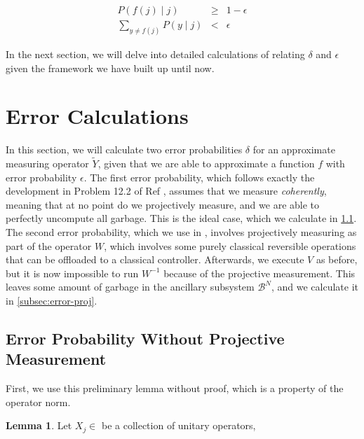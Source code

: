 \documentclass{article}
\theoremstyle{definition} \newtheorem{lemma}{Lemma}
\theoremstyle{definition} \newtheorem{theorem}{Theorem}
\begin{document}
\begin{eqnarray}
P(f(j) \mid j) & \ge & 1 - \epsilon \\
\sum_{y \ne f(j)} P(y \mid j) & < & \epsilon
\label{eqn:f-approx}
\end{eqnarray}

In the next section, we will delve into detailed calculations of relating
$\delta$ and $\epsilon$ given the framework we have built up until now.

\section{Error Calculations}

In this section, we will calculate two error probabilities $\delta$ for
an approximate measuring operator $\tilde{Y}$, given that we are able to
approximate a function $f$ with error probability $\epsilon$. The first
error probability, which follows exactly the development in Problem 12.2
of Ref \cite{Kitaev2002}, assumes that we measure \emph{coherently}, meaning
that at no point do we projectively measure, and we are able to perfectly
uncompute all garbage. This is the ideal case, which we calculate in
\ref{subsec:error-noproj}. The second error probability, which we use in
\cite{Pham2012a}, involves projectively measuring as part of the operator $W$,
which involves some purely classical reversible operations that can be
offloaded to a classical controller. Afterwards, we execute $V$ as before,
but it is now impossible to run $W^{-1}$ because of the projective measurement.
This leaves some amount of garbage in the ancillary
subsystem $\mathcal{B}^N$, and we calculate it in \ref{subsec:error-proj}.

\subsection{Error Probability Without Projective Measurement}
\label{subsec:error-noproj}

First, we use this preliminary lemma without proof, which is a property of
the operator norm.

\begin{lemma}
\label{lemma:sum-norm}
Let $X_j \in $ be a collection of unitary operators,
\end{lemma}
\end{document}
